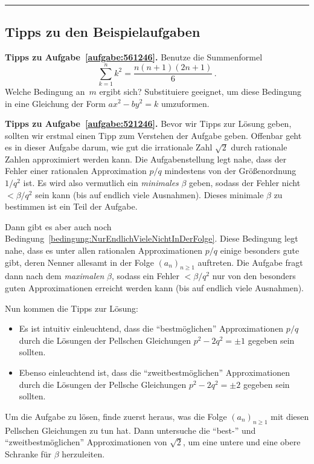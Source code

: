 \vfill\hrule\vspace{-1em}

\subsection*{Tipps zu den Beispielaufgaben}

\textbf{Tipps zu Aufgabe~\ref{aufgabe:561246}.} Benutze die Summenformel
\begin{equation*}
	\sum_{k=1}^nk^2=\frac{n(n+1)(2n+1)}{6}\,.
\end{equation*}
Welche Bedingung an~$m$ ergibt sich? Substituiere geeignet, um diese Bedingung in eine Gleichung der Form $ax^2-by^2=k$ umzuformen.

\textbf{Tipps zu Aufgabe~\ref{aufgabe:521246}.} Bevor wir Tipps zur Lösung geben, sollten wir erstmal einen Tipp zum Verstehen der Aufgabe geben. Offenbar geht es in dieser Aufgabe darum, wie gut die irrationale Zahl $\sqrt{2}$ durch rationale Zahlen approximiert werden kann. Die Aufgabenstellung legt nahe, dass der Fehler einer rationalen Approximation $p/q$ mindestens von der Größenordnung $1/q^2$ ist. Es wird also vermutlich ein \emph{minimales} $\beta$ geben, sodass der Fehler nicht $<\beta/q^2$ sein kann (bis auf endlich viele Ausnahmen). Dieses minimale $\beta$ zu bestimmen ist ein Teil der Aufgabe.

Dann gibt es aber auch noch Bedingung~\ref{bedingung:NurEndlichVieleNichtInDerFolge}. Diese Bedingung legt nahe, dass es unter allen rationalen Approximationen $p/q$ einige besonders gute gibt, deren Nenner allesamt in der Folge $(a_n)_{n\geqslant1}$ auftreten. Die Aufgabe fragt dann nach dem \emph{maximalen} $\beta$, sodass ein Fehler $<\beta/q^2$ nur von den besonders guten Approximationen erreicht werden kann (bis auf endlich viele Ausnahmen).

Nun kommen die Tipps zur Lösung:
\begin{itemize}
	\item Es ist intuitiv einleuchtend, dass die \enquote{bestmöglichen} Approximationen $p/q$ durch die Lösungen der Pellschen Gleichungen $p^2-2q^2 =\pm1$ gegeben sein sollten.
	\item Ebenso einleuchtend ist, dass die \enquote{zweitbestmöglichen} Approximationen durch die Lösungen der Pellsche Gleichungen $p^2-2q^2=\pm2$ gegeben sein sollten.
\end{itemize}
Um die Aufgabe zu lösen, finde zuerst heraus, was die Folge $(a_n)_{n\geqslant 1}$ mit diesen Pellschen Gleichungen zu tun hat. Dann untersuche die \enquote{best-} und \enquote{zweitbestmöglichen} Approximationen von $\sqrt{2}$, um eine untere und eine obere Schranke für $\beta$ herzuleiten.
